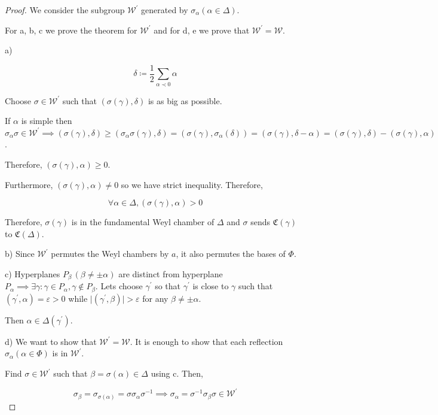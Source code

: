 \documentclass{article}
\theoremstyle{definition}
\begin{document}
\begin{proof}
    We consider the subgroup \(\mathcal{W}^{\prime}\)  generated by \(\sigma_\alpha( \alpha \in \Delta)\).

    For a, b, c we prove the theorem for \(\mathcal{W}^{\prime}\) and for d, e we prove that \(\mathcal{W}^{\prime} = \mathcal{W}\).

    a)

    \[
        \delta \coloneqq \frac{1}{2} \sum_{\alpha \prec 0} \alpha 
    \]

    Choose \(\sigma \in \mathcal{W}^{\prime}\) such that \((\sigma(\gamma), \delta)\) is as big as possible.

    If \(\alpha\) is simple then \(\sigma_\alpha \sigma \in \mathcal{W} ^{\prime} \implies (\sigma(\gamma), \delta) \geq (\sigma_\alpha \sigma(\gamma),\delta) = (\sigma(\gamma), \sigma_\alpha(\delta))=(\sigma(\gamma), \delta -\alpha) = (\sigma(\gamma),\delta) - (\sigma(\gamma),\alpha)\).

    Therefore, \((\sigma(\gamma),\alpha)\geq 0\).

    Furthermore, \((\sigma(\gamma),\alpha)\neq 0\) so we have strict inequality. Therefore,

    \[
        \forall \alpha \in \Delta, (\sigma(\gamma), \alpha) > 0
    \]

    Therefore, \(\sigma(\gamma)\) is in the fundamental Weyl chamber of \(\Delta\) and \(\sigma\) sends \(\mathfrak{C}(\gamma)\) to \(\mathfrak{C}(\Delta)\).

    b) Since \(\mathcal{W}^{\prime}\) permutes the Weyl chambers by \(a\), it also permutes the bases of \(\Phi\).

    c) Hyperplanes \(P_\beta\, (\beta \neq \pm \alpha)\) are distinct from hyperplane \(P_\alpha \implies \exists \gamma: \gamma \in P_\alpha, \gamma \notin P_\beta\). Lets choose \(\gamma^{\prime}\) so that \(\gamma^{\prime}\) is close to \(\gamma\) such that \((\gamma ^{\prime} , \alpha) = \varepsilon > 0\) while \(\vert (\gamma^{\prime} , \beta) \vert > \varepsilon\) for any \(\beta \neq \pm \alpha\).

    Then \(\alpha \in \Delta(\gamma^{\prime})\).

    d) We want to show that \(\mathcal{W} ^{\prime} = \mathcal{W}\). It is enough to show that each reflection \(\sigma_\alpha(\alpha \in \Phi)\) is in \(\mathcal{W}^{\prime}\).
    
    Find \(\sigma \in \mathcal{W} ^{\prime} \) such that \(\beta = \sigma (\alpha)\in \Delta \) using c. Then,

    \[
        \sigma_\beta = \sigma_{\sigma(\alpha)} = \sigma \sigma_\alpha \sigma ^{-1} \implies \sigma_\alpha = \sigma ^{-1} \sigma _\beta \sigma \in \mathcal{W} ^{\prime} 
    \]

\end{proof}
\end{document}

